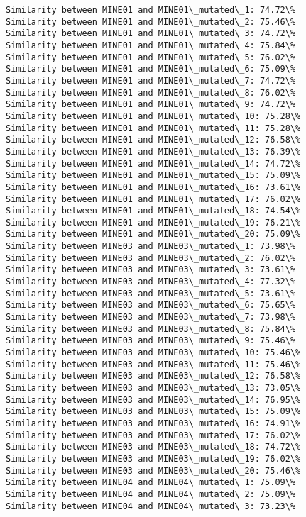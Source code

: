 \documentclass[11pt]{article}
\begin{document}
    \begin{Verbatim}[commandchars=\\\{\}]
Similarity between MINE01 and MINE01\_mutated\_1: 74.72\%
Similarity between MINE01 and MINE01\_mutated\_2: 75.46\%
Similarity between MINE01 and MINE01\_mutated\_3: 74.72\%
Similarity between MINE01 and MINE01\_mutated\_4: 75.84\%
Similarity between MINE01 and MINE01\_mutated\_5: 76.02\%
Similarity between MINE01 and MINE01\_mutated\_6: 75.09\%
Similarity between MINE01 and MINE01\_mutated\_7: 74.72\%
Similarity between MINE01 and MINE01\_mutated\_8: 76.02\%
Similarity between MINE01 and MINE01\_mutated\_9: 74.72\%
Similarity between MINE01 and MINE01\_mutated\_10: 75.28\%
Similarity between MINE01 and MINE01\_mutated\_11: 75.28\%
Similarity between MINE01 and MINE01\_mutated\_12: 76.58\%
Similarity between MINE01 and MINE01\_mutated\_13: 76.39\%
Similarity between MINE01 and MINE01\_mutated\_14: 74.72\%
Similarity between MINE01 and MINE01\_mutated\_15: 75.09\%
Similarity between MINE01 and MINE01\_mutated\_16: 73.61\%
Similarity between MINE01 and MINE01\_mutated\_17: 76.02\%
Similarity between MINE01 and MINE01\_mutated\_18: 74.54\%
Similarity between MINE01 and MINE01\_mutated\_19: 76.21\%
Similarity between MINE01 and MINE01\_mutated\_20: 75.09\%
Similarity between MINE03 and MINE03\_mutated\_1: 73.98\%
Similarity between MINE03 and MINE03\_mutated\_2: 76.02\%
Similarity between MINE03 and MINE03\_mutated\_3: 73.61\%
Similarity between MINE03 and MINE03\_mutated\_4: 77.32\%
Similarity between MINE03 and MINE03\_mutated\_5: 73.61\%
Similarity between MINE03 and MINE03\_mutated\_6: 75.65\%
Similarity between MINE03 and MINE03\_mutated\_7: 73.98\%
Similarity between MINE03 and MINE03\_mutated\_8: 75.84\%
Similarity between MINE03 and MINE03\_mutated\_9: 75.46\%
Similarity between MINE03 and MINE03\_mutated\_10: 75.46\%
Similarity between MINE03 and MINE03\_mutated\_11: 75.46\%
Similarity between MINE03 and MINE03\_mutated\_12: 76.58\%
Similarity between MINE03 and MINE03\_mutated\_13: 73.05\%
Similarity between MINE03 and MINE03\_mutated\_14: 76.95\%
Similarity between MINE03 and MINE03\_mutated\_15: 75.09\%
Similarity between MINE03 and MINE03\_mutated\_16: 74.91\%
Similarity between MINE03 and MINE03\_mutated\_17: 76.02\%
Similarity between MINE03 and MINE03\_mutated\_18: 74.72\%
Similarity between MINE03 and MINE03\_mutated\_19: 76.02\%
Similarity between MINE03 and MINE03\_mutated\_20: 75.46\%
Similarity between MINE04 and MINE04\_mutated\_1: 75.09\%
Similarity between MINE04 and MINE04\_mutated\_2: 75.09\%
Similarity between MINE04 and MINE04\_mutated\_3: 73.23\%

\end{Verbatim}
\end{document}
